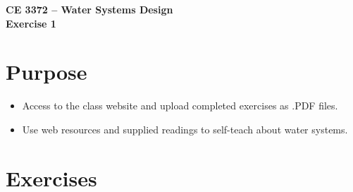\documentclass[12pt]{article}
\begin{document}
\begin{center}
{\textbf{{ CE 3372 -- Water Systems Design} \\ {Exercise 1}}}
\end{center}
\section*{{Purpose}} 
\begin{itemize}
\item Access to the class website and upload completed exercises as .PDF files.
\item Use web resources and supplied readings to self-teach about water systems.
\end{itemize}
\section*{Exercises}
\end{document}

